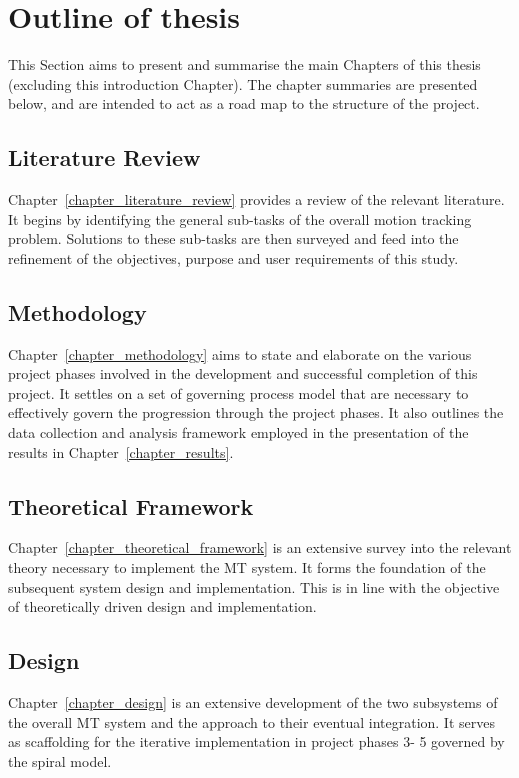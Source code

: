 \section{Outline of thesis}
This Section aims to present and summarise the main Chapters of this thesis
(excluding this introduction Chapter). The chapter summaries are presented below, and
are intended to act as a road map to the structure of the project.

\subsection{Literature Review}
Chapter~\ref{chapter_literature_review} provides a review of the
relevant literature. It begins by identifying the general sub-tasks of the
overall motion tracking problem. Solutions to these sub-tasks are then surveyed and
feed into the refinement of the objectives, purpose and user requirements of
this study.

\subsection{Methodology}
Chapter~\ref{chapter_methodology} aims to state and elaborate on the various
project phases involved in the development and successful completion of this
project. It settles on a set of governing process model that are necessary to
effectively govern the progression through the project phases. It also outlines
the data collection and analysis framework employed in the presentation of the
results in Chapter~\ref{chapter_results}.

\subsection{Theoretical Framework}
Chapter~\ref{chapter_theoretical_framework} is an extensive survey into the
relevant theory necessary to implement the MT system. It forms the foundation of
the subsequent system design and implementation. This is in line with the objective of
theoretically driven design and implementation. 

\subsection{Design}
Chapter~\ref{chapter_design} is an extensive development of the
two subsystems of the overall MT system and the approach to their eventual
integration. It serves as scaffolding for the iterative implementation in project
phases 3- 5 governed by the spiral model.

